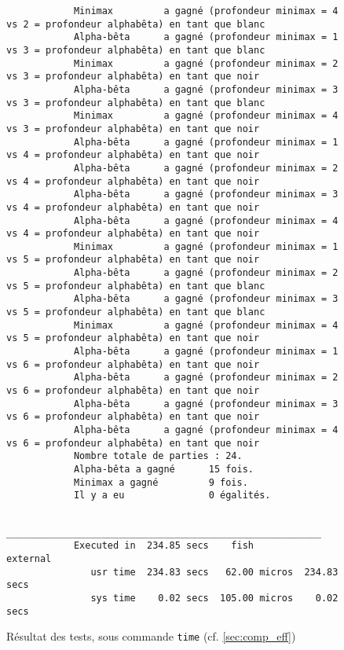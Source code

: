 \documentclass{article}
\begin{document}
\begin{figure}[h]
\begin{minipage}{1\textwidth}
\begin{verbatim}
            Minimax         a gagné (profondeur minimax = 4 vs 2 = profondeur alphabêta) en tant que blanc
            Alpha-bêta      a gagné (profondeur minimax = 1 vs 3 = profondeur alphabêta) en tant que blanc
            Minimax         a gagné (profondeur minimax = 2 vs 3 = profondeur alphabêta) en tant que noir
            Alpha-bêta      a gagné (profondeur minimax = 3 vs 3 = profondeur alphabêta) en tant que blanc
            Minimax         a gagné (profondeur minimax = 4 vs 3 = profondeur alphabêta) en tant que noir
            Alpha-bêta      a gagné (profondeur minimax = 1 vs 4 = profondeur alphabêta) en tant que noir
            Alpha-bêta      a gagné (profondeur minimax = 2 vs 4 = profondeur alphabêta) en tant que noir
            Alpha-bêta      a gagné (profondeur minimax = 3 vs 4 = profondeur alphabêta) en tant que noir
            Alpha-bêta      a gagné (profondeur minimax = 4 vs 4 = profondeur alphabêta) en tant que noir
            Minimax         a gagné (profondeur minimax = 1 vs 5 = profondeur alphabêta) en tant que noir
            Alpha-bêta      a gagné (profondeur minimax = 2 vs 5 = profondeur alphabêta) en tant que blanc
            Alpha-bêta      a gagné (profondeur minimax = 3 vs 5 = profondeur alphabêta) en tant que blanc
            Minimax         a gagné (profondeur minimax = 4 vs 5 = profondeur alphabêta) en tant que noir
            Alpha-bêta      a gagné (profondeur minimax = 1 vs 6 = profondeur alphabêta) en tant que noir
            Alpha-bêta      a gagné (profondeur minimax = 2 vs 6 = profondeur alphabêta) en tant que noir
            Alpha-bêta      a gagné (profondeur minimax = 3 vs 6 = profondeur alphabêta) en tant que noir
            Alpha-bêta      a gagné (profondeur minimax = 4 vs 6 = profondeur alphabêta) en tant que noir
            Nombre totale de parties : 24.
            Alpha-bêta a gagné      15 fois.
            Minimax a gagné         9 fois.
            Il y a eu               0 égalités.
        \end{verbatim}
        \begin{verbatim}
            ________________________________________________________
            Executed in  234.85 secs    fish           external
               usr time  234.83 secs   62.00 micros  234.83 secs
               sys time    0.02 secs  105.00 micros    0.02 secs
        \end{verbatim}
    \end{minipage}
    \caption{Résultat des tests, sous commande \texttt{time} (cf. \autoref{sec:comp_eff})}
    \label{txt:tests_res}
\end{figure}
\end{document}

